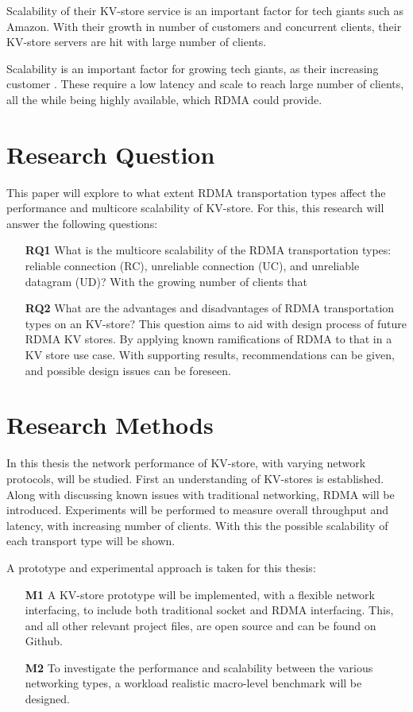 Scalability of their KV-store service is an important factor for tech giants such as Amazon.
With their growth in number of customers and concurrent clients, their KV-store servers are hit with large number of clients.



Scalability is an important factor for growing tech giants, as their increasing customer .
These require a low latency and scale to reach large number of clients, all the while being highly available\cite{decandia2007dynamo}, which RDMA could provide.

\section{Research Question}
This paper will explore to what extent RDMA transportation types affect the performance and multicore scalability of KV-store.
For this, this research will answer the following questions:

\begin{itemize}
    \item[\textbf{RQ1}] What is the multicore scalability of the RDMA transportation types: reliable connection (RC), unreliable connection (UC), and unreliable datagram (UD)?
    With the growing number of clients that
    \item[\textbf{RQ2}] What are the advantages and disadvantages of RDMA transportation types on an KV-store?
    This question aims to aid with design process of future RDMA KV stores.
    By applying known ramifications of RDMA to that in a KV store use case.
    With supporting results, recommendations can be given, and possible design issues can be foreseen.
\end{itemize}

\section{Research Methods}
In this thesis the network performance of KV-store, with varying network protocols, will be studied.
First an understanding of KV-stores is established.
Along with discussing known issues with traditional networking, RDMA will be introduced.
Experiments will be performed to measure overall throughput and latency, with increasing number of clients.
With this the possible scalability of each transport type will be shown.

A prototype\cite{iosup2019atlarge,hamming1998art,peffers2007design} and experimental\cite{jain1990art,heiser2010,ousterhout2018always} approach is taken for this thesis:
\begin{itemize}
    \item[\textbf{M1}] A KV-store prototype will be implemented, with a flexible network interfacing, to include both traditional socket and RDMA interfacing.
    This, and all other relevant project files, are open source and can be found on Github\cite{github}.
    \item[\textbf{M2}] To investigate the performance and scalability between the various networking types, a workload realistic\cite{atikoglu2012workload} macro-level benchmark will be designed.
\end{itemize}

